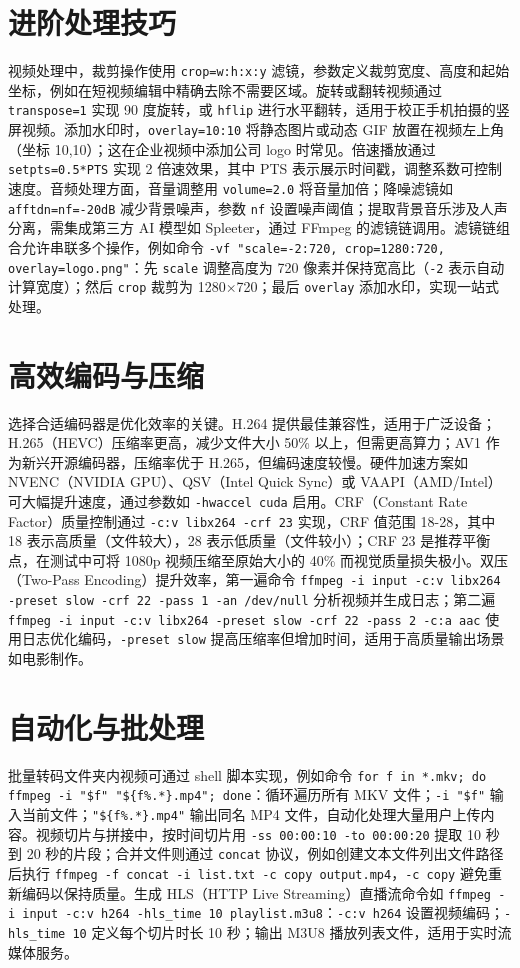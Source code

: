 \chapter{进阶处理技巧}
视频处理中，裁剪操作使用 \verb!crop=w:h:x:y! 滤镜，参数定义裁剪宽度、高度和起始坐标，例如在短视频编辑中精确去除不需要区域。旋转或翻转视频通过 \verb!transpose=1! 实现 90 度旋转，或 \verb!hflip! 进行水平翻转，适用于校正手机拍摄的竖屏视频。添加水印时，\verb!overlay=10:10! 将静态图片或动态 GIF 放置在视频左上角（坐标 10,10）；这在企业视频中添加公司 logo 时常见。倍速播放通过 \verb!setpts=0.5*PTS! 实现 2 倍速效果，其中 PTS 表示展示时间戳，调整系数可控制速度。音频处理方面，音量调整用 \verb!volume=2.0! 将音量加倍；降噪滤镜如 \verb!afftdn=nf=-20dB! 减少背景噪声，参数 \verb!nf! 设置噪声阈值；提取背景音乐涉及人声分离，需集成第三方 AI 模型如 Spleeter，通过 FFmpeg 的滤镜链调用。滤镜链组合允许串联多个操作，例如命令 \verb!-vf "scale=-2:720, crop=1280:720, overlay=logo.png"!：先 \verb!scale! 调整高度为 720 像素并保持宽高比（\verb!-2! 表示自动计算宽度）；然后 \verb!crop! 裁剪为 1280×720；最后 \verb!overlay! 添加水印，实现一站式处理。\par
\chapter{高效编码与压缩}
选择合适编码器是优化效率的关键。H.264 提供最佳兼容性，适用于广泛设备；H.265（HEVC）压缩率更高，减少文件大小 50\%{} 以上，但需更高算力；AV1 作为新兴开源编码器，压缩率优于 H.265，但编码速度较慢。硬件加速方案如 NVENC（NVIDIA GPU）、QSV（Intel Quick Sync）或 VAAPI（AMD/Intel）可大幅提升速度，通过参数如 \verb!-hwaccel cuda! 启用。CRF（Constant Rate Factor）质量控制通过 \verb!-c:v libx264 -crf 23! 实现，CRF 值范围 18-28，其中 18 表示高质量（文件较大），28 表示低质量（文件较小）；CRF 23 是推荐平衡点，在测试中可将 1080p 视频压缩至原始大小的 40\%{} 而视觉质量损失极小。双压（Two-Pass Encoding）提升效率，第一遍命令 \verb!ffmpeg -i input -c:v libx264 -preset slow -crf 22 -pass 1 -an /dev/null! 分析视频并生成日志；第二遍 \verb!ffmpeg -i input -c:v libx264 -preset slow -crf 22 -pass 2 -c:a aac! 使用日志优化编码，\verb!-preset slow! 提高压缩率但增加时间，适用于高质量输出场景如电影制作。\par
\chapter{自动化与批处理}
批量转码文件夹内视频可通过 shell 脚本实现，例如命令 \verb!for f in *.mkv; do ffmpeg -i "$f" "${f%.*}.mp4"; done!：循环遍历所有 MKV 文件；\verb!-i "$f"! 输入当前文件；\verb!"${f%.*}.mp4"! 输出同名 MP4 文件，自动化处理大量用户上传内容。视频切片与拼接中，按时间切片用 \verb!-ss 00:00:10 -to 00:00:20! 提取 10 秒到 20 秒的片段；合并文件则通过 \verb!concat! 协议，例如创建文本文件列出文件路径后执行 \verb!ffmpeg -f concat -i list.txt -c copy output.mp4!，\verb!-c copy! 避免重新编码以保持质量。生成 HLS（HTTP Live Streaming）直播流命令如 \verb!ffmpeg -i input -c:v h264 -hls_time 10 playlist.m3u8!：\verb!-c:v h264! 设置视频编码；\verb!-hls_time 10! 定义每个切片时长 10 秒；输出 M3U8 播放列表文件，适用于实时流媒体服务。\par
